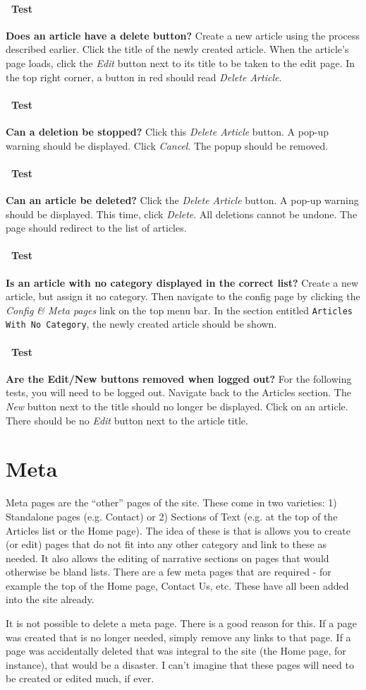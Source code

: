 \documentclass[12pt]{article}
\newcounter{Test}
\newcommand{\test}[1]{%
\stepcounter{Test}%
\paragraph{\Circle\ Test \theTest} \textbf{#1} }
\begin{document}
\test{Does an article have a delete button?}
Create a new article using the process described earlier. Click the title of the newly created article. When the article's page loads, click the \textit{Edit} button next to its title to be taken to the edit page. In the top right corner, a button in red should read \textit{Delete Article}.

\test{Can a deletion be stopped?}
Click this \textit{Delete Article} button. A pop-up warning should be displayed. Click \textit{Cancel}. The popup should be removed.

\test{Can an article be deleted?}
Click the \textit{Delete Article} button. A pop-up warning should be displayed. This time, click \textit{Delete}. All deletions cannot be undone. The page should redirect to the list of articles.

\test{Is an article with no category displayed in the correct list?}
Create a new article, but assign it no category. Then navigate to the config page by clicking the \textit{Config \& Meta pages} link on the top menu bar. In the section entitled \texttt{Articles With No Category}, the newly created article should be shown.

\test{Are the Edit/New buttons removed when logged out?}
For the following tests, you will need to be logged out. Navigate back to the Articles section. The \textit{New} button next to the title should no longer be displayed. Click on an article. There should be no \textit{Edit} button next to the article title.

\section{Meta}\label{sec:meta}
Meta pages are the ``other'' pages of the site. These come in two varieties: 1) Standalone pages (e.g. Contact) or 2) Sections of Text (e.g. at the top of the Articles list or the Home page). The idea of these is that is allows you to create (or edit) pages that do not fit into any other category and link to these as needed. It also allows the editing of narrative sections on pages that would otherwise be bland lists. There are a few meta pages that are required - for example the top of the Home page, Contact Us, etc. These have all been added into the site already.

It is not possible to delete a meta page. There is a good reason for this. If a page was created that is no longer needed, simply remove any links to that page. If a page was accidentally deleted that was integral to the site (the Home page, for instance), that would be a disaster. I can't imagine that these pages will need to be created or edited much, if ever.
\end{document}
